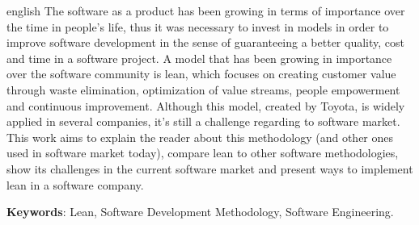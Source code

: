  
\begin{resumo}[ABSTRACT]
 \begin{otherlanguage*}{english}
 The software as a product has been growing in terms of importance over the time in people’s life, thus it was necessary to invest in models in order to improve software development in the sense of guaranteeing a better quality, cost and time in  a software project. A model that has been growing in importance over the software community is lean, which focuses on creating customer value through waste elimination, optimization of value streams, people empowerment and continuous improvement. Although this model, created by Toyota, is widely applied in several companies, it’s still a challenge regarding to software market. This work aims to explain the reader about this methodology (and other ones used in software market today), compare lean to other software methodologies, show its challenges in the current software market and present ways to implement lean in a software company.

\textbf{Keywords}: Lean, Software Development Methodology, Software Engineering.
 \end{otherlanguage*}
\end{resumo}


\listoffigures*
\cleardoublepage


\listoftables*
\cleardoublepage

